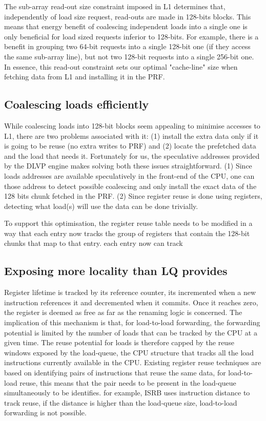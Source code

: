 \documentclass{sig-alternate}
\begin{document}
The sub-array read-out size constraint imposed in L1 determines that, independently of load size request, read-outs are made in 128-bits blocks. This means that energy benefit of coalescing independent loads into a single one is only beneficial for load sized requests inferior to 128-bits. For example, there is a benefit in grouping two 64-bit requests into a single 128-bit one (if they access the same sub-array line), but not two 128-bit requests into a single 256-bit one. In essence, this read-out constraint sets our optimal "cache-line" size when fetching data from L1 and installing it in the PRF.


\subsection{Coalescing loads efficiently}
While coalescing loads into 128-bit blocks seem appealing to minimise accesses to L1, there are two problems associated with it: (1) install the extra data only if it is going to be reuse (no extra writes to PRF) and (2) locate the prefetched data and the load that needs it. Fortunately for us, the speculative addresses provided by the DLVP engine makes solving both these issues straightforward. (1) Since loads addresses are available speculatively in the front-end of the CPU, one can those address to detect possible coalescing and only install the exact data of the 128 bits chunk fetched in the PRF. (2) Since register reuse is done using registers, detecting what load(s) will use the data can be done trivially.

To support this optimisation, the register reuse table needs to be modified in a way that each entry now tracks the group of registers that contain the 128-bit chunks that map to that entry. each entry now can track  




\subsection{Exposing more locality than LQ provides}
Register lifetime is tracked by its reference counter, its incremented when a new instruction references it and decremented when it commits. Once it reaches zero, the register is deemed as free as far as the renaming logic is concerned. The implication of this mechanism is that, for load-to-load forwarding, the forwarding potential is limited by the number of loads that can be tracked by the CPU at a given time. The reuse potential for loads is therefore capped by the reuse windows exposed by the load-queue, the CPU structure that tracks all the load instructions currently available in the CPU. Existing register reuse techniques are based on identifying pairs of instructions that reuse the same data, for load-to-load reuse, this means that the pair needs to be present in the load-queue simultaneously to be identifies. for example, ISRB uses instruction distance to track reuse, if the distance is higher than the load-queue size, load-to-load forwarding is not possible. 
\end{document}
